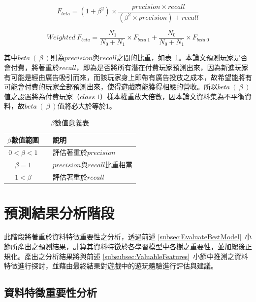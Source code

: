 \begin{equation}
  \label{eq:FbetaFormula}
  F_{beta} = (1 + \beta^2) \times \frac{precision \times recall}{(\beta^2 \times precision) + recall}
\end{equation}

\begin{equation}
  \label{eq:WeightedFbetaFormula}
  Weighted\ F_{beta} = \frac{N_1}{N_0 + N_1} \times F_{beta\ 1} + \frac{N_0}{N_0 + N_1} \times F_{beta\ 0}
\end{equation}

其中$beta\ (\ \beta\ )$則為$precision$與$recall$之間的比重，如表~\ref{tab:beta}。本論文預測玩家是否會付費，將著重於$recall$，即為是否將所有潛在付費玩家預測出來，因為新進玩家有可能是經由廣告吸引而來，而該玩家身上即帶有廣告投放之成本，故希望能將有可能會付費的玩家全部預測出來，使得遊戲商能獲得相應的營收。所以$beta\ (\ \beta\ )$值之設置將為付費玩家（$class\ 1$）樣本權重放大倍數，因本論文資料集為不平衡資料，故$beta\ (\ \beta\ )$值將必大於等於1。

\begin{table}[!htb]
	\centering
	\begin{tabular}{ccl}
		\hline \hline
		$\beta$數值範圍 && 說明 \\
    \hline \hline
    $0 < \beta < 1$ && 評估著重於$precision$ \\
    \hline
    $\beta = 1$ && $precision$與$recall$比重相當 \\
    \hline
    $1 < \beta$ && 評估著重於$recall$ \\
    \hline \hline
		\end{tabular}
	\caption[$\beta$數值意義表]{$\beta$數值意義表}
	\label{tab:beta}
\end{table}
\newpage

\section{預測結果分析階段}

此階段將著重於資料特徵重要性之分析，透過前述 \ref{subsec:EvaluateBestModel}~小節所產出之預測結果，計算其資料特徵於各學習模型中各樹之重要性，並加總後正規化。產出之分析結果將與前述 \ref{subsubsec:ValuableFeatures}~小節中推測之資料特徵進行探討，並藉由最終結果對遊戲中的遊玩體驗進行評估與建議。

\subsection{資料特徵重要性分析}
\label{subsec:FeatureImportanceAnalysis}

